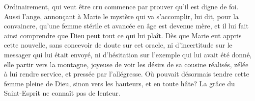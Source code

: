Ordinairement,
	qui veut être cru commence par prouver qu’il est digne de foi.
Aussi l’ange, annonçant à Marie le mystère qui va s’accomplir,
	lui dit, pour la convaincre,
	qu’une femme stérile et avancée en âge est devenue mère,
	et il lui fait ainsi comprendre que Dieu peut tout ce qui lui plaît.
Dès que Marie eut appris cette nouvelle,
	sans concevoir de doute sur cet oracle,
	ni d’incertitude sur le messager qui lui était envoyé,
	ni d’hésitation sur l’exemple qui lui avait été donné,
	elle partir vers la montagne,
	joyeuse de voir les désirs de sa cousine réalisés,
	zélée à lui rendre service,
	et pressée par l’allégresse.
Où pouvait désormais tendre cette femme pleine de Dieu,
	sinon vers les hauteurs, et en toute hâte?
	La grâce du Saint-Esprit ne connaît pas de lenteur.
